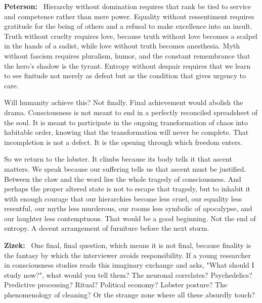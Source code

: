\documentclass[a4paper,11pt]{article}
\newenvironment{question}{\par\noindent\color{ALIUSRed}\textbf{Zizek:}\ }{\par}
\newenvironment{answer}{\par\noindent\color{black}\textbf{Peterson:}\ }{\par}
\begin{document}
\begin{answer}
Hierarchy without domination requires that rank be tied to service and competence rather than mere power. Equality without ressentiment requires gratitude for the being of others and a refusal to make excellence into an insult. Truth without cruelty requires love, because truth without love becomes a scalpel in the hands of a sadist, while love without truth becomes anesthesia. Myth without fascism requires pluralism, humor, and the constant remembrance that the hero's shadow is the tyrant. Entropy without despair requires that we learn to see finitude not merely as defeat but as the condition that gives urgency to care.

Will humanity achieve this? Not finally. Final achievement would abolish the drama. Consciousness is not meant to end in a perfectly reconciled spreadsheet of the soul. It is meant to participate in the ongoing transformation of chaos into habitable order, knowing that the transformation will never be complete. That incompletion is not a defect. It is the opening through which freedom enters.

So we return to the lobster. It climbs because its body tells it that ascent matters. We speak because our suffering tells us that ascent must be justified. Between the claw and the word lies the whole tragedy of consciousness. And perhaps the proper altered state is not to escape that tragedy, but to inhabit it with enough courage that our hierarchies become less cruel, our equality less resentful, our myths less murderous, our rooms less symbolic of apocalypse, and our laughter less contemptuous. That would be a good beginning. Not the end of entropy. A decent arrangement of furniture before the next storm.
\end{answer}

\begin{question}
One final, final question, which means it is not final, because finality is the fantasy by which the interviewer avoids responsibility. If a young researcher in consciousness studies reads this imaginary exchange and asks, "What should I study now?", what would you tell them? The neuronal correlates? Psychedelics? Predictive processing? Ritual? Political economy? Lobster posture? The phenomenology of cleaning? Or the strange zone where all these absurdly touch?
\end{question}
\end{document}
